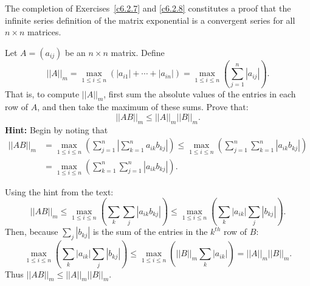 \documentclass{ximera}
\begin{document}
  The completion of Exercises~\ref{c6.2.7} and
\ref{c6.2.8} constitutes a proof that the infinite series definition of
the matrix exponential is a convergent series for all $n\times n$ matrices.

\begin{computerExercise}  \label{c6.2.7}
Let $A=(a_{ij})$ be an $n\times n$ matrix.  Define
\[
||A||_m = \max_{1\leq i\leq n} (|a_{i1}|+\cdots+|a_{in}|)
= \max_{1\leq i\leq n} \left(\sum_{j=1}^n|a_{ij}|\right).
\]
That is, to compute $||A||_m$, first sum the absolute values of the entries
in each row of $A$, and then take the maximum of these sums.  Prove that:
\[
||AB||_m \leq ||A||_m ||B||_m.
\]
{\bf Hint:} Begin by noting that
\begin{align*}
||AB||_m &=
\max_{1\leq i\leq n}\left(\sum_{j=1}^n\left|\sum_{k=1}^na_{ik}b_{kj}\right|
\right)\leq \max_{1\leq i\leq n}\left(\sum_{j=1}^n\sum_{k=1}^n\left|a_{ik}b_{kj}
           \right|\right) \\
  &= \max_{1\leq i\leq n}\left(\sum_{k=1}^n\sum_{j=1}^n
\left|a_{ik}b_{kj}\right|\right).
\end{align*}

\begin{solution}
Using the hint from the text:
\[
||AB||_m \leq \max_{1\leq i\leq n}
\left(\sum_k\sum_j\left|a_{ik}b_{kj}\right|\right) \leq
\max_{1\leq i\leq n} \left(\sum_k|a_{ik}|\sum_j|b_{kj}|\right).
\]
Then, because $\sum_j|b_{kj}|$ is the sum of the entries in the $k^{th}$
row of $B$:
\[
\max_{1\leq i\leq n}
\left(\sum_k|a_{ik}|\sum_j|b_{kj}|\right) \leq
\max_{1 \leq i \leq n}
\left(||B||_m \sum_k|a_{ik}|\right) =
||A||_m ||B||_m.
\]
Thus $||AB||_m \leq ||A||_m ||B||_m$.

\end{solution}
\end{computerExercise}
\end{document}
